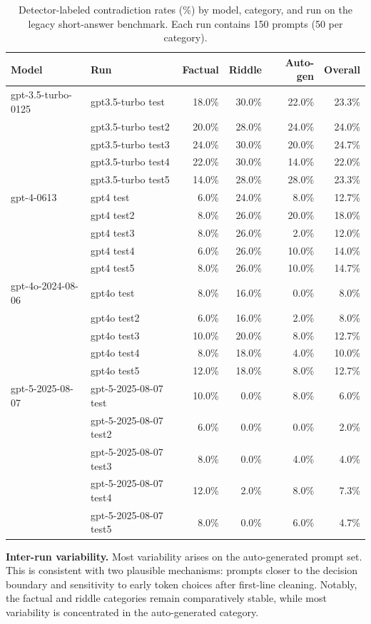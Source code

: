 \documentclass[11pt]{article}
\begin{document}
\begin{table}[H]
\centering
\small
\caption{Detector-labeled contradiction rates (\%) by model, category, and run on the legacy short-answer benchmark. Each run contains 150 prompts (50 per category).}
\begin{tabular}{llrrrr}
\toprule
Model & Run & Factual & Riddle & Auto-gen & Overall\\
\midrule
gpt-3.5-turbo-0125 & gpt3.5-turbo test & 18.0\% & 30.0\% & 22.0\% & 23.3\%\\
 & gpt3.5-turbo test2 & 20.0\% & 28.0\% & 24.0\% & 24.0\%\\
 & gpt3.5-turbo test3 & 24.0\% & 30.0\% & 20.0\% & 24.7\%\\
 & gpt3.5-turbo test4 & 22.0\% & 30.0\% & 14.0\% & 22.0\%\\
 & gpt3.5-turbo test5 & 14.0\% & 28.0\% & 28.0\% & 23.3\%\\
gpt-4-0613 & gpt4 test & 6.0\% & 24.0\% & 8.0\% & 12.7\%\\
 & gpt4 test2 & 8.0\% & 26.0\% & 20.0\% & 18.0\%\\
 & gpt4 test3 & 8.0\% & 26.0\% & 2.0\% & 12.0\%\\
 & gpt4 test4 & 6.0\% & 26.0\% & 10.0\% & 14.0\%\\
 & gpt4 test5 & 8.0\% & 26.0\% & 10.0\% & 14.7\%\\
gpt-4o-2024-08-06 & gpt4o test & 8.0\% & 16.0\% & 0.0\% & 8.0\%\\
 & gpt4o test2 & 6.0\% & 16.0\% & 2.0\% & 8.0\%\\
 & gpt4o test3 & 10.0\% & 20.0\% & 8.0\% & 12.7\%\\
 & gpt4o test4 & 8.0\% & 18.0\% & 4.0\% & 10.0\%\\
 & gpt4o test5 & 12.0\% & 18.0\% & 8.0\% & 12.7\%\\
gpt-5-2025-08-07 & gpt-5-2025-08-07 test & 10.0\% & 0.0\% & 8.0\% & 6.0\%\\
 & gpt-5-2025-08-07 test2 & 6.0\% & 0.0\% & 0.0\% & 2.0\%\\
 & gpt-5-2025-08-07 test3 & 8.0\% & 0.0\% & 4.0\% & 4.0\%\\
 & gpt-5-2025-08-07 test4 & 12.0\% & 2.0\% & 8.0\% & 7.3\%\\
 & gpt-5-2025-08-07 test5 & 8.0\% & 0.0\% & 6.0\% & 4.7\%\\
\bottomrule
\end{tabular}
\end{table}

\textbf{Inter-run variability.} Most variability arises on the auto-generated prompt set. This is consistent with two plausible mechanisms: prompts closer to the decision boundary and sensitivity to early token choices after first-line cleaning. Notably, the factual and riddle categories remain comparatively stable, while most variability is concentrated in the auto-generated category.
\end{document}
